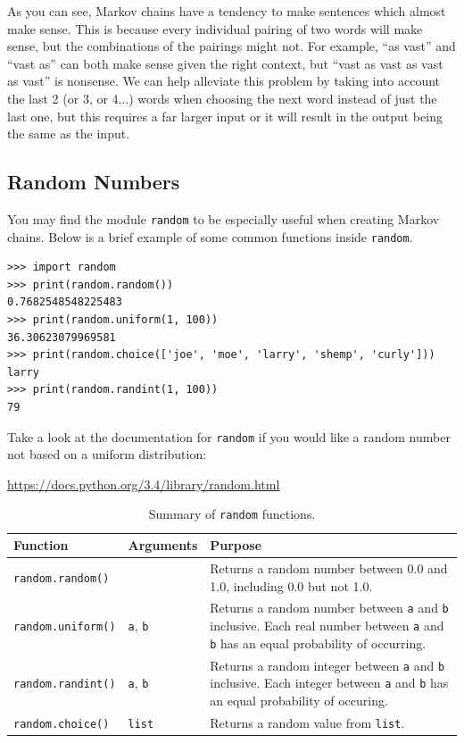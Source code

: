 \documentclass[11pt]{cselabheader}
\begin{document}
As you can see, Markov chains have a tendency to make sentences which almost
make sense. This is because every individual pairing of two words will make
sense, but the combinations of the pairings might not. For example, ``as vast''
and ``vast as'' can both make sense given the right context, but ``vast as vast
as vast as vast'' is nonsense. We can help alleviate this problem by taking into
account the last 2 (or 3, or 4...) words when choosing the next word instead of
just the last one, but this requires a far larger input or it will result in the
output being the same as the input.

\subsection{Random Numbers}
\label{subsec:random}
You may find the module \lstinline!random! to be especially useful when
creating Markov chains. Below is a brief example of some common functions
inside \lstinline!random!.

\begin{lstlisting}[style=ipython]
>>> import random
>>> print(random.random())
0.7682548548225483
>>> print(random.uniform(1, 100))
36.30623079969581
>>> print(random.choice(['joe', 'moe', 'larry', 'shemp', 'curly']))
larry
>>> print(random.randint(1, 100))
79
\end{lstlisting}

Take a look at the documentation for \lstinline!random! if you would like a
random number not based on a uniform distribution:
\begin{center}
  \url{https://docs.python.org/3.4/library/random.html}
\end{center}

\begin{table}[!ht]
  \centering
  \begin{tabular}{p{3.0cm} p{2cm} p{10cm}}
    \toprule
    \bfseries Function & \bfseries Arguments & \bfseries Purpose \\
    \midrule
    \lstinline{random.random()} & & Returns a random number between 0.0 and 1.0,
    including 0.0 but not 1.0.\\
    \lstinline{random.uniform()} & \lstinline{a}, \lstinline{b} & Returns a
    random number between \lstinline{a} and \lstinline{b} inclusive. Each real number between
    \lstinline!a! and \lstinline!b! has an equal probability of occurring.\\
    \lstinline{random.randint()} & \lstinline{a}, \lstinline{b} & Returns a
    random integer between \lstinline{a} and \lstinline{b} inclusive. Each integer between
    \lstinline!a! and \lstinline!b! has an equal probability of occuring.\\
    \lstinline{random.choice()} & \lstinline{list} & Returns a random value from \lstinline{list}.\\
    \bottomrule
  \end{tabular}
  \caption{Summary of \lstinline{random} functions.}
  \label{tab:rand}
\end{table}
\end{document}
